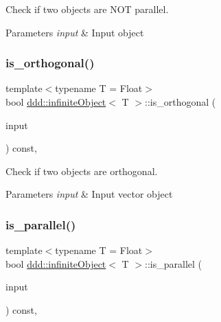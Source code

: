 Check if two objects are N\+OT parallel. 


\begin{DoxyParams}{Parameters}
{\em input} & Input object \\
\hline
\end{DoxyParams}
\mbox{\label{classddd_1_1infinite_object_a634f0db3a5447756901c43f8f3d20a8a}} 
\subsubsection{\texorpdfstring{is\+\_\+orthogonal()}{is\_orthogonal()}}
{\footnotesize\ttfamily template$<$typename T = Float$>$ \\
bool \hyperlink{classddd_1_1infinite_object}{ddd\+::infinite\+Object}$<$ T $>$\+::is\+\_\+orthogonal (\begin{DoxyParamCaption}\item[{const \hyperlink{classddd_1_1infinite_object}{infinite\+Object}$<$ T $>$ \&}]{input }\end{DoxyParamCaption}) const\hspace{0.3cm}{\ttfamily [inline]}, {\ttfamily [inherited]}}



Check if two objects are orthogonal. 


\begin{DoxyParams}{Parameters}
{\em input} & Input vector object \\
\hline
\end{DoxyParams}
\mbox{\label{classddd_1_1infinite_object_a52c16b849e5bd987c69ed6ae79a6cab1}} 
\subsubsection{\texorpdfstring{is\+\_\+parallel()}{is\_parallel()}}
{\footnotesize\ttfamily template$<$typename T = Float$>$ \\
bool \hyperlink{classddd_1_1infinite_object}{ddd\+::infinite\+Object}$<$ T $>$\+::is\+\_\+parallel (\begin{DoxyParamCaption}\item[{const \hyperlink{classddd_1_1infinite_object}{infinite\+Object}$<$ T $>$ \&}]{input }\end{DoxyParamCaption}) const\hspace{0.3cm}{\ttfamily [inline]}, {\ttfamily [inherited]}}



